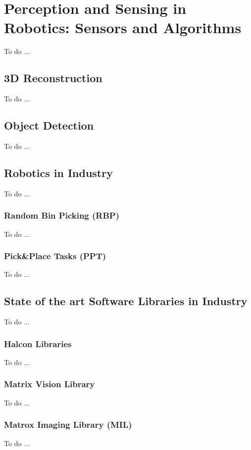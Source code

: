 \chapter{Perception and Sensing in Robotics: Sensors and Algorithms}\label{ch:perceptionandsensing}
To do ...

\section{3D Reconstruction}\label{sec:3dreconstruction}
To do ...

\section{Object Detection}\label{sec:objectdetection}
To do ...

\section{Robotics in Industry}\label{sec:roboticsinindustry}
To do ...

\subsection{Random Bin Picking (RBP)}\label{subsec:binpicking}
To do ...

\subsection{Pick\&Place Tasks (PPT)}\label{subsec:pickandplace}
To do ...

\section{State of the art Software Libraries in Industry}\label{sec:industrylibraries}
To do ...

\subsection{Halcon Libraries}\label{subsec:halconlibs}
To do ...

\subsection{Matrix Vision Library}\label{subsec:matrixvision}
To do ...

\subsection{Matrox Imaging Library (MIL)}\label{subsec:mil}
To do ...